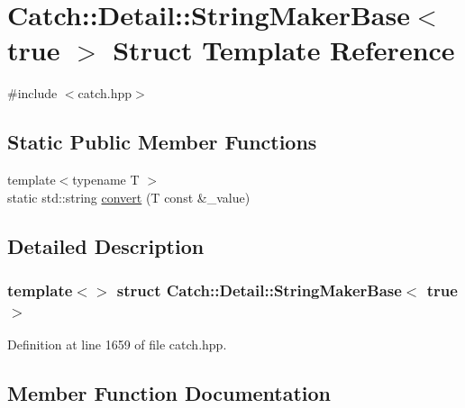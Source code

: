 \hypertarget{struct_catch_1_1_detail_1_1_string_maker_base_3_01true_01_4}{}\section{Catch\+:\+:Detail\+:\+:String\+Maker\+Base$<$ true $>$ Struct Template Reference}
\label{struct_catch_1_1_detail_1_1_string_maker_base_3_01true_01_4}


{\ttfamily \#include $<$catch.\+hpp$>$}

\subsection*{Static Public Member Functions}
\begin{DoxyCompactItemize}
\item 
{\footnotesize template$<$typename T $>$ }\\static std\+::string \hyperlink{struct_catch_1_1_detail_1_1_string_maker_base_3_01true_01_4_af9b5fdf7fddd8c5c873caa819e5f00f6}{convert} (T const \&\+\_\+value)
\end{DoxyCompactItemize}


\subsection{Detailed Description}
\subsubsection*{template$<$$>$\newline
struct Catch\+::\+Detail\+::\+String\+Maker\+Base$<$ true $>$}



Definition at line 1659 of file catch.\+hpp.



\subsection{Member Function Documentation}
\hypertarget{struct_catch_1_1_detail_1_1_string_maker_base_3_01true_01_4_af9b5fdf7fddd8c5c873caa819e5f00f6}{}\label{struct_catch_1_1_detail_1_1_string_maker_base_3_01true_01_4_af9b5fdf7fddd8c5c873caa819e5f00f6} 
